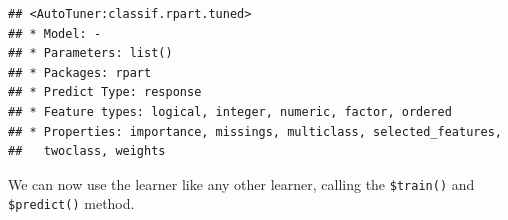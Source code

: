 \documentclass[
]{scrbook}
\newenvironment{Shaded}{\begin{snugshade}}{\end{snugshade}}
\newcommand{\FunctionTok}[1]{\textcolor[rgb]{0.00,0.00,0.00}{#1}}
\newcommand{\NormalTok}[1]{#1}
\newcommand{\SpecialCharTok}[1]{\textcolor[rgb]{0.00,0.00,0.00}{#1}}
\renewenvironment{Shaded} {\begin{snugshade}\small} {\end{snugshade}}
\begin{document}
\begin{verbatim}
## <AutoTuner:classif.rpart.tuned>
## * Model: -
## * Parameters: list()
## * Packages: rpart
## * Predict Type: response
## * Feature types: logical, integer, numeric, factor, ordered
## * Properties: importance, missings, multiclass, selected_features,
##   twoclass, weights
\end{verbatim}

We can now use the learner like any other learner, calling the \texttt{\$train()} and \texttt{\$predict()} method.

\begin{Shaded}
\end{Shaded}
\end{document}
